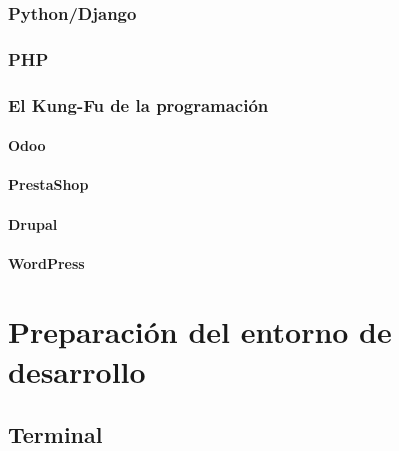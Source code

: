 \documentclass[a4paper,11pt,spanish]{sphinxmanual}
\begin{document}
\subsection{Python/Django}
\label{\detokenize{introduccion-al-desarrollo-web:python-django}}

\subsection{PHP}
\label{\detokenize{introduccion-al-desarrollo-web:php}}

\subsection{El Kung-Fu de la programación}
\label{\detokenize{introduccion-al-desarrollo-web:el-kung-fu-de-la-programacion}}

\subsubsection{Odoo}
\label{\detokenize{introduccion-al-desarrollo-web:odoo}}

\subsubsection{PrestaShop}
\label{\detokenize{introduccion-al-desarrollo-web:prestashop}}

\subsubsection{Drupal}
\label{\detokenize{introduccion-al-desarrollo-web:drupal}}

\subsubsection{WordPress}
\label{\detokenize{introduccion-al-desarrollo-web:wordpress}}

\chapter{Preparación del entorno de desarrollo}
\label{\detokenize{introduccion-al-desarrollo-web:preparacion-del-entorno-de-desarrollo}}

\section{Terminal}
\label{\detokenize{introduccion-al-desarrollo-web:terminal}}
\end{document}
